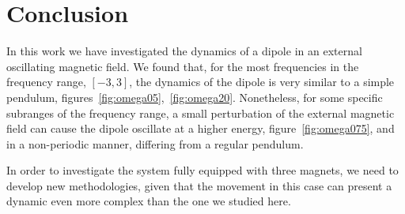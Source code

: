 \section{Conclusion}

In this work we have investigated the dynamics of a dipole in an external oscillating magnetic field. We found that, for the most frequencies in the frequency range, $[-3,3]$, the dynamics of the dipole is very similar to a simple pendulum, figures~\ref{fig:omega05},~\ref{fig:omega20}. Nonetheless, for some specific subranges of the frequency range, a small perturbation of the external magnetic field can cause the dipole oscillate at a higher energy, figure~\ref{fig:omega075}, and in a non-periodic manner, differing from a regular pendulum. 

In order to investigate the system fully equipped with three magnets, we need to develop new methodologies, given that the movement in this case can present a dynamic even more complex than the one we studied here. 
\clearpage